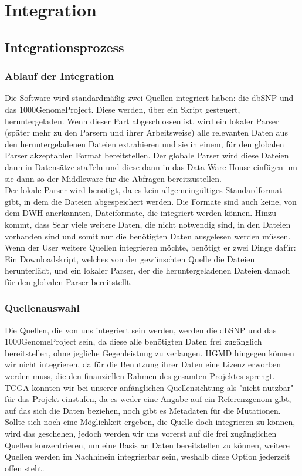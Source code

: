 
\section{Integration}
\subsection{Integrationsprozess}
\subsubsection{Ablauf der Integration}
Die Software wird standardmäßig zwei Quellen integriert haben: die dbSNP und das 1000GenomeProject. Diese werden, über ein Skript gesteuert, heruntergeladen. Wenn dieser Part abgeschlossen ist, wird ein lokaler Parser (später mehr zu den Parsern und ihrer Arbeitsweise) alle relevanten Daten aus den heruntergeladenen Dateien extrahieren und sie in einem, für den globalen Parser akzeptablen Format bereitstellen. Der globale Parser wird diese Dateien dann in Datensätze staffeln und diese dann in das Data Ware House einfügen um sie dann so der Middleware für die Abfragen bereitzustellen.\\
Der lokale Parser wird benötigt, da es kein allgemeingültiges Standardformat gibt, in dem die Dateien abgespeichert werden. Die Formate sind auch keine, von dem DWH anerkannten, Dateiformate, die integriert werden können. Hinzu kommt, dass Sehr viele weitere Daten, die nicht notwendig sind, in den Dateien vorhanden sind und somit nur die benötigten Daten ausgelesen werden müssen.\\
Wenn der User weitere Quellen integrieren möchte, benötigt er zwei Dinge dafür: Ein Downloadskript, welches von der gewünschten Quelle die Dateien herunterlädt, und ein lokaler Parser, der die heruntergeladenen Dateien danach für den globalen Parser bereitstellt.
\subsubsection{Quellenauswahl}
Die Quellen, die von uns integriert sein werden, werden die dbSNP und das 1000GenomeProject sein, da diese alle benötigten Daten frei zugänglich bereitstellen, ohne jegliche Gegenleistung zu verlangen. HGMD hingegen können wir nicht integrieren, da für die Benutzung ihrer Daten eine Lizenz erworben werden muss, die den finanziellen Rahmen des gesamten Projektes sprengt. TCGA konnten wir bei unserer anfänglichen Quellensichtung als "nicht nutzbar" für das Projekt einstufen, da es weder eine Angabe auf ein Referenzgenom gibt, auf das sich die Daten beziehen, noch gibt es Metadaten für die Mutationen. Sollte sich noch eine Möglichkeit ergeben, die Quelle doch integrieren zu können, wird das geschehen, jedoch werden wir uns vorerst auf die frei zugänglichen Quellen konzentrieren, um eine Basis an Daten bereitstellen zu können, weitere Quellen werden im Nachhinein integrierbar sein, weshalb diese Option jederzeit offen steht.
